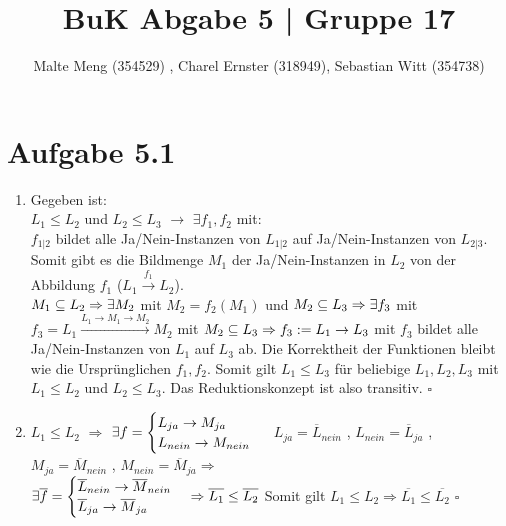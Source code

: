 \documentclass{article}
\title{BuK Abgabe 5 | Gruppe 17}
\author{Malte Meng (354529) , Charel Ernster (318949), Sebastian Witt (354738)}
\begin{document}
	\maketitle 
	\section[a 5.1]{Aufgabe 5.1}
		\begin{enumerate} [label=(\alph*).]
			\item Gegeben ist:\\
			$L_1 \leq L_2$ und $L_2 \leq L_3$
			$\rightarrow$
			$\exists f_1,f_2$ mit:\\
			$f_{1|2}$ bildet alle Ja/Nein-Instanzen von $L_{1|2}$ auf Ja/Nein-Instanzen von $L_{2|3}$.\\
			Somit gibt es die Bildmenge $M_1$ der Ja/Nein-Instanzen in $L_2$ von der Abbildung $f_1$ ($L_1 \xrightarrow{f_1} L_2$).\\
			$M_1 \subseteq L_2 \Rightarrow\\ \exists M_2$ mit $M_2 = f_2(M_1)$ und $M_2 \subseteq L_3 \Rightarrow\\
			\exists f_3$ mit $f_3 = L_1 \xrightarrow{L_1 \rightarrow M_1 \rightarrow M_2} M_2$ mit $ M_2 \subseteq L_3 \Rightarrow\\
			f_3 := L_1 \rightarrow L_3$ mit $f_3$ bildet alle Ja/Nein-Instanzen von $L_1$ auf $L_3$ ab. Die Korrektheit der Funktionen bleibt wie die Ursprünglichen $f_1,f_2$. Somit gilt $L_1 \leq L_3$ für beliebige $L_1,L_2,L_3$ mit $L_1 \leq L_2$ und $L_2 \leq L_3$. Das Reduktionskonzept ist also transitiv.  $\square$
			\item $L_1 \leq L_2$ $\Rightarrow$ $\exists f = \begin{cases}
				L_{ja} \rightarrow M_{ja}\\
				L_{nein} \rightarrow M_{nein}\\
			\end{cases}\\$
			$L_{ja} = \overline{L}_{nein}$ , $L_{nein} = \overline{L}_{ja}$ , $M_{ja} = \overline{M}_{nein}$ , $M_{nein} = \overline{M}_{ja} \Rightarrow$\\
			$\exists \overline{f} = \begin{cases}
				\overline{L}_{nein} \rightarrow \overline{M}_{nein}\\
				\overline{L}_{ja} \rightarrow \overline{M}_{ja}\\
			\end{cases}\Rightarrow \overline{L_1} \leq \overline{L_2}\\$ Somit gilt $L_1 \leq L_2 \Rightarrow \overline{L_1} \leq \overline{L_2}$  $\square$
		\end{enumerate}
\end{document}
